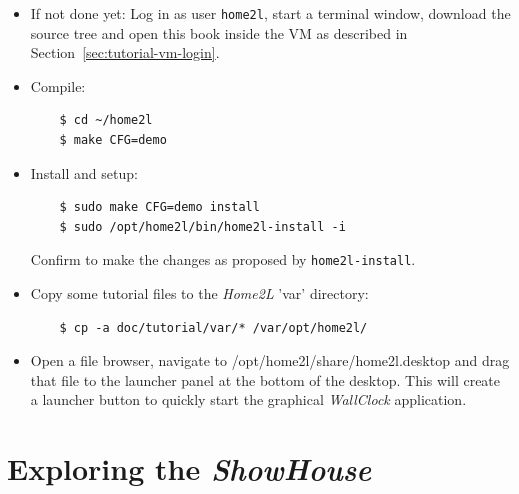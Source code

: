 \documentclass[12pt,english,parskip=half]{scrreprt}
\newcommand{\lst}[1]{\colorbox{lstbackground}{\ttfamily\footnotesize#1}}
\begin{document}
\begin{itemize}[$\blacktriangleright$]

\item
  If not done yet: Log in as user \texttt{home2l}, start a terminal window,
  download the source tree and open this book inside the VM as described
  in Section~\ref{sec:tutorial-vm-login}.

\item
  Compile:
  \begin{lstlisting}
    $ cd ~/home2l
    $ make CFG=demo
  \end{lstlisting}

\item
  Install and setup:
  \begin{lstlisting}
    $ sudo make CFG=demo install
    $ sudo /opt/home2l/bin/home2l-install -i
  \end{lstlisting}
  Confirm to make the changes as proposed by \texttt{home2l-install}.

\item
  Copy some tutorial files to the \emph{Home2L} 'var' directory:
  \begin{lstlisting}
    $ cp -a doc/tutorial/var/* /var/opt/home2l/
  \end{lstlisting}

\item
  Open a file browser, navigate to \lst{/opt/home2l/share/home2l.desktop}
  and drag that file to the launcher panel at the bottom of the desktop.
  This will create a launcher button to quickly start the graphical
  \emph{WallClock} application.

\end{itemize}





\section{Exploring the \emph{ShowHouse}}
\label{sec:tutorial-firststeps}
\end{document}
